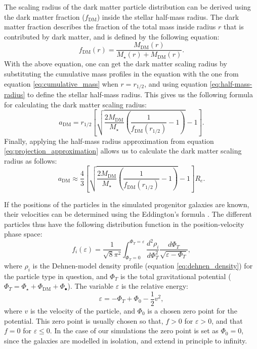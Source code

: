 \documentclass[english, twoside]{HYgradu}
\begin{document}
The scaling radius of the dark matter particle distribution can be derived using the dark matter fraction ($f_{\mathrm{DM}}$) inside the stellar half-mass radius. The dark matter fraction describes the fraction of the total mass inside radius $r$ that is contributed by dark matter, and is defined by the following equation:
\begin{equation}
f_\mathrm{DM}(r) = \frac{M_\mathrm{DM}(r)}{M_\star(r) + M_\mathrm{DM}(r)}. \label{eq:dm_fraction}
\end{equation}
With the above equation, one can get the dark matter scaling radius by substituting the cumulative mass profiles in the equation with the one from equation \ref{eq:cumulative_mass} when $r=r_{1/2}$, and using equation \ref{eq:half-mass-radius} to define the stellar half-mass radius. This gives us the following formula for calculating the dark matter scaling radius:
\begin{equation}
a_\mathrm{DM} =  r_\mathrm{1/2} \left[ \sqrt{\frac{2M_\mathrm{DM}}{M_\star} \left( \frac{1}{f_\mathrm{DM}(r_{1/2})} - 1 \right)} -1 \right].
\end{equation}
Finally, applying the half-mass radius approximation from equation \ref{eq:projection_approximation} allows us to calculate the dark matter scaling radius as follows:
\begin{equation}
a_\mathrm{DM} \approx \frac{4}{3} \left[ \sqrt{\frac{2M_\mathrm{DM}}{M_\star} \left( \frac{1}{f_\mathrm{DM}(r_{1/2})} - 1 \right)} -1 \right] R_e.
\end{equation}

If the positions of the particles in the simulated progenitor galaxies are known, their velocities can be determined using the Eddington's formula \citep{BinneyTremaine}. The different particles thus have the following distribution function in the position-velocity phase space:
\begin{equation}
f_i(\varepsilon) = \frac{1}{\sqrt{8}\pi^2} \int^{\Phi_T = \varepsilon}_{\Phi_T = 0} \frac{d^2\rho_i}{d\Phi^2_T}
\frac{d\Phi_T}{\sqrt{\varepsilon - \Phi_T}}, \label{eq:eddington_form}
\end{equation}
where $\rho_i$ is the Dehnen-model density profile (equation \ref{eq:dehnen_density}) for the particle type in question, and $\Phi_T$ is the total gravitational potential ($\Phi_T = \Phi_\star + \Phi_\mathrm{DM} + \Phi_\bullet$). The variable $\varepsilon$ is the relative energy:
\begin{equation}
\varepsilon = -\Phi_T + \Phi_0 - \frac{1}{2} v^2,
\end{equation}
where $v$ is the velocity of the particle, and $\Phi_0$ is a chosen zero point for the potential. This zero point is usually chosen so that, $f > 0$ for $\varepsilon > 0$, and that $f = 0$ for $\varepsilon \leq 0$. In the case of our simulations the zero point is set as $\Phi_0 = 0$, since the galaxies are modelled in isolation, and extend in principle to infinity.
\end{document}
